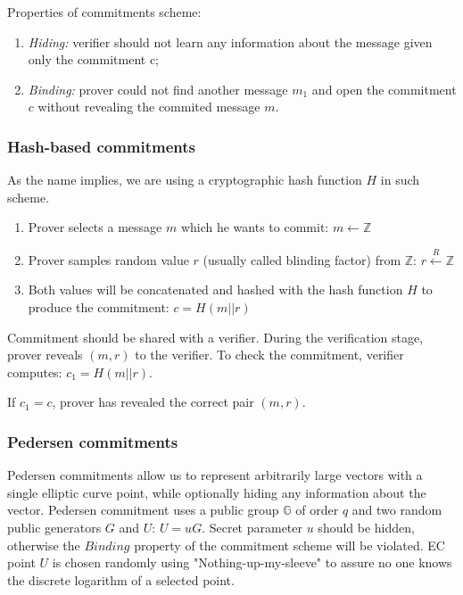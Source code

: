 \documentclass[../lecture-notes.tex]{subfiles}
\begin{document}
Properties of commitments scheme:
\begin{enumerate}
    \item \textit{Hiding: } verifier should not learn any information about the message given only the commitment c;
    \item \textit{Binding: } prover could not find another message $m_1$ and open the commitment $c$ without revealing the commited message $m$.
\end{enumerate}

\subsubsection{Hash-based commitments}

As the name implies, we are using a cryptographic hash function \(H\) in such scheme.

\begin{enumerate}
    \item Prover selects a message $m$ which he wants to commit:
        $m \leftarrow \mathbb{Z}$

    \item Prover samples random value $r$ (usually called blinding factor) from $\mathbb{Z}$:
        $r \xleftarrow{R} \mathbb{Z}$
    
    \item Both values will be concatenated and hashed with the hash function $H$ to produce the commitment:
        $c = H(m || r)$

\end{enumerate}

Commitment should be shared with a verifier. During the verification stage, prover reveals $(m, r)$ to the verifier. 
To check the commitment, verifier computes: $c_1 = H(m || r)$.

If $c_1 = c$, prover has revealed the correct pair $(m, r)$.

\subsubsection{Pedersen commitments}

Pedersen commitments allow us to represent arbitrarily large vectors with a single elliptic curve point, while optionally hiding any information about the vector. Pedersen commitment uses a public group $\mathbb{G}$ of order $q$ and two random public generators $G$ and $U$: $U = uG$. Secret parameter $u$ should be hidden, otherwise the $\textit{Binding}$ property of the commitment scheme will be violated.
EC point $U$ is chosen randomly using "Nothing-up-my-sleeve" to assure no one knows the discrete logarithm of a selected point.
\end{document}
